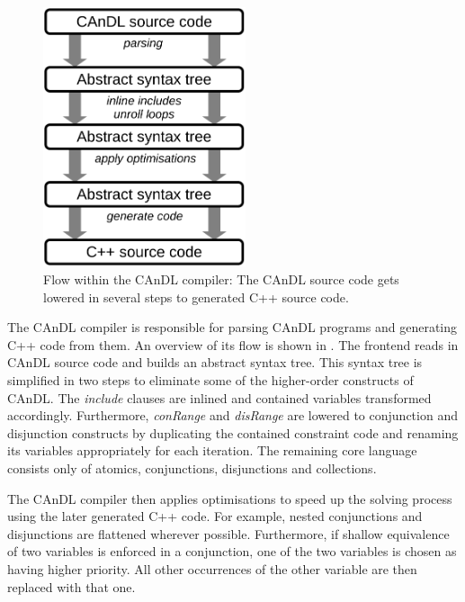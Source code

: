 \begin{figure}[t]
\centering
\begin{minipage}{0.7\textwidth}
\centering
\includegraphics[width=0.53\textwidth]{figures/candlstages.pdf}
\caption{Flow within the CAnDL compiler:
         The CAnDL source code gets lowered in several steps to generated C++
         source code.}
\label{fig:compilerflow}
\end{minipage}
\end{figure}

    The CAnDL compiler is responsible for parsing CAnDL programs and
    generating C++ code from them.
    An overview of its  flow is shown in .
    The frontend reads in  CAnDL source code and builds an abstract syntax tree.
    This syntax tree is simplified in two steps to eliminate some of the
    higher-order constructs of CAnDL.
    The {\it include} clauses are inlined and contained variables
    transformed accordingly.
    Furthermore, {\it conRange} and {\it disRange} are lowered to
    conjunction and disjunction constructs by duplicating the contained
    constraint code and renaming its variables appropriately for each iteration.
    The remaining core language consists only of atomics, conjunctions,
    disjunctions and collections.

    The CAnDL compiler then applies optimisations to speed up the solving
    process using the later generated C++ code.
    For example, nested conjunctions and disjunctions are flattened wherever
    possible.
    Furthermore, if shallow equivalence of two variables is enforced in a
    conjunction, one of the two variables is chosen as having higher priority.
    All other occurrences of the other variable are then replaced with that
    one.

